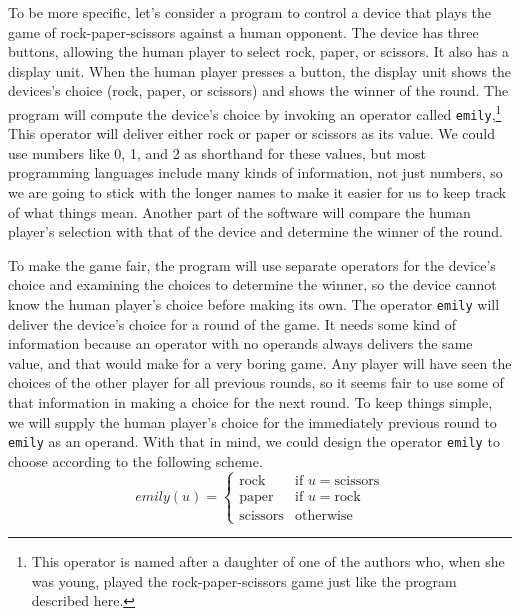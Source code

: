 To be more specific, let's consider a program to control
a device that plays the game of rock-paper-scissors against a human opponent.
The device has three buttons, allowing the human player to select rock, paper, or
scissors.  It also has a display unit.
When the human player presses a button,
the display unit shows the devices's choice (rock, paper, or scissors)
and shows the winner of the round.
The program will compute the device's choice
by invoking an operator called \texttt{emily},\footnote{This operator is
named after a daughter of one of the authors who, when she was young,
played the rock-paper-scissors game just like the program described here.}
This operator will deliver
either rock or paper or scissors as its value.
We could use numbers like 0, 1, and 2 as shorthand for these values,
but most programming languages include many
kinds of information, not just numbers,
so we are going to stick with the longer names
to make it easier for us to keep track of what things mean.
Another part of the software will compare the human player's
selection with that of the device and determine the winner of the round.

To make the game fair, the program will use
separate operators for the device's choice and
examining the choices to determine the winner,
so the device cannot know the human player's choice before making its own.
The operator \texttt{emily} will deliver the device's choice for a round of the game.
It needs some kind of information because an operator with no operands
always delivers the same value, and that would make for a very boring game.
Any player will have seen the choices of the other player for
all previous rounds, so it seems fair to use some of that information in
making a choice for the next round.
To keep things simple, we will supply the human player's choice for the
immediately previous round to \texttt{emily} as an operand.
With that in mind, we could design the operator \texttt{emily} to choose
according to the following scheme.
\begin{displaymath}
emily(u) =
   \left\{
        \begin{array}{ll}
        \mbox{rock}     & \mbox{if } u = \mbox{scissors} \\
        \mbox{paper}    & \mbox{if } u = \mbox{rock} \\
        \mbox{scissors} & \mbox{otherwise}
        \end{array}
   \right.
\end{displaymath}

